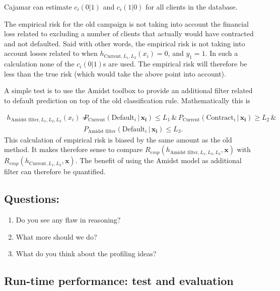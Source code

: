 \documentclass{article}
\theoremstyle{theorem}
\theoremstyle{definition}
\newcommand{\bv}[1]{\bm{#1}}
\begin{document}
{Cajamar can estimate $c_i(0|1)$ and $c_i(1|0)$ for all clients in the database.


The empirical risk for the old campaign is not taking into account the financial loss related to excluding a number of clients that actually would have contracted and not defaulted.  Said with other words, the empirical risk is not taking into account losses related to when $h_{\mbox{Current},L_1,L_2}(x_i) = 0$, and $y_1 = 1$.  In such a calculation none of the $c_i(0|1)$s are used.  The empirical risk will therefore be less than the true risk (which would take the above point into account).

A simple test is to use the Amidst toolbox to provide an additional filter related to default prediction on top of the old classification rule.  Mathematically this is

\begin{equation}
\begin{split}
\label{eq:filter}
h_{\mbox{Amidst filter},L_1,L_2,L_3}(x_i) = &
P_{\mbox{Current}}(\mbox{Default}_i \,|\, \bv{x_i}) \leq L_1
 \, \& \,
P_{\mbox{Current}}(\mbox{Contract}_i \,|\, \bv{x_i}) \geq L_2
\, \& \,  
\\ &
P_{\mbox{Amidst filter}}(\mbox{Default}_i \,|\, \bv{x_i}) \leq L_3.
\end{split}
\end{equation}
This calculation of empirical risk is biased by the same amount as the old method.  It makes therefore sense to compare $R_{emp}(h_{\mbox{Amidst filter},L_1,L_2,L_3}, \bv{x}) $ with $R_{emp}(h_{\mbox{Current},L_1,L_2}, \bv{x}) $.
The benefit of using the Amidst model as additional filter can therefore be quantified.

\subsection*{Questions: }
\begin{enumerate}
\item Do you see any flaw in reasoning?
\item What more should we do?
\item What do you think about the profiling ideas?
\end{enumerate}


}

\subsection{Run-time performance: test and evaluation}
\end{document}
